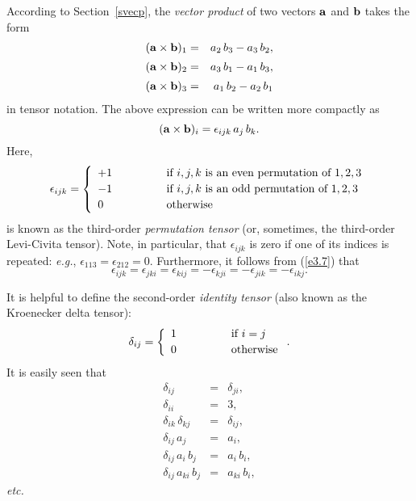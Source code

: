 According to Section~\ref{svecp}, the {\em vector product}\/ of two vectors ${\bf a}$ and ${\bf b}$
takes the form
\begin{eqnarray}
({\bf a}\times {\bf b})_1 &=& a_2\,b_3-a_3\,b_2,\\[0.5ex]
({\bf a}\times {\bf b})_2 &=& a_3\,b_1-a_1\,b_3,\\[0.5ex]
({\bf a}\times {\bf b})_3 &=&a_1\,b_2-a_2\,b_1
\end{eqnarray}
in tensor notation. 
The above expression can be written more compactly as
\begin{equation}\label{e3.6}
({\bf a}\times {\bf b})_i = \epsilon_{ijk}\,a_j\,b_k.
\end{equation}
Here,
\begin{equation}
\epsilon_{ijk} = \left\{
\begin{array}{lll}
+1&\mbox{\hspace{1cm}}& \mbox{if $i, j, k$ is an even permutation of $1, 2, 3$}\\[0.5ex]
-1&&\mbox{if $i, j, k$ is an odd permutation of $1, 2, 3$}\\[0.5ex]
0&&\mbox{otherwise}
\end{array}\right.\label{e3.7}
\end{equation}
is known as the third-order {\em permutation tensor}\/ (or, sometimes, the third-order Levi-Civita tensor). Note, in particular, that $\epsilon_{ijk}$ is zero if one of its indices is
repeated: {\em e.g.}, $\epsilon_{113}=\epsilon_{212}=0$. 
Furthermore, it follows from (\ref{e3.7}) that
\begin{equation}\label{e3.8}
\epsilon_{ijk}=\epsilon_{jki}=\epsilon_{kij}=-\epsilon_{kji}=-\epsilon_{jik}=-\epsilon_{ikj}.
\end{equation}

It is helpful to define the second-order {\em identity tensor}\/ (also known as the Kroenecker delta tensor):
 \begin{equation}
\delta_{ij} = \left\{
\begin{array}{lll}
1&\mbox{\hspace{1cm}}& \mbox{if $i=j$}\\[0.5ex]
0&&\mbox{otherwise}
\end{array}\right. .
\end{equation}
It is easily seen that
\begin{eqnarray}
\delta_{ij} &=& \delta_{ji},\label{e3.10}\\[0.5ex]
\delta_{ii} &=&3,\\[0.5ex]
\delta_{ik}\,\delta_{kj} &=& \delta_{ij},\label{e3.11}\\[0.5ex]
\delta_{ij}\,a_j &=& a_i,\label{e3.11a}\\[0.5ex]
\delta_{ij}\,a_i\,b_j &=& a_i\,b_i,\label{e3.11b}\\[0.5ex]
\delta_{ij}\,a_{ki}\,b_j &=& a_{ki}\,b_i,
\end{eqnarray}
{\em etc.} 

